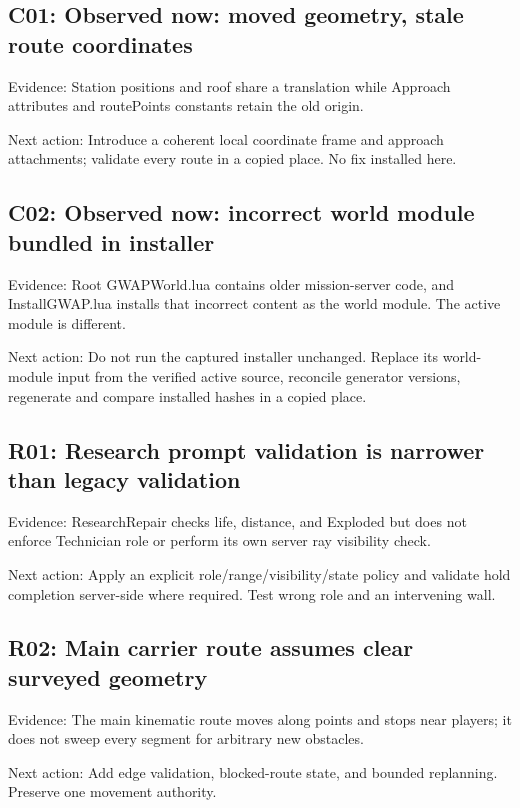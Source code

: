 \subsection{C01: Observed now: moved geometry, stale route coordinates}
Evidence: Station positions and roof share a translation while Approach attributes and routePoints constants retain the old origin.\allowbreak{}

Next action: Introduce a coherent local coordinate frame and approach attachments; validate every route in a copied place.\allowbreak{} No fix installed here.\allowbreak{}

\subsection{C02: Observed now: incorrect world module bundled in installer}
Evidence: Root GWAPWorld.\allowbreak{}lua contains older mission-server code, and InstallGWAP.\allowbreak{}lua installs that incorrect content as the world module.\allowbreak{} The active module is different.\allowbreak{}

Next action: Do not run the captured installer unchanged.\allowbreak{} Replace its world-module input from the verified active source, reconcile generator versions, regenerate and compare installed hashes in a copied place.\allowbreak{}

\subsection{R01: Research prompt validation is narrower than legacy validation}
Evidence: ResearchRepair checks life, distance, and Exploded but does not enforce Technician role or perform its own server ray visibility check.\allowbreak{}

Next action: Apply an explicit role/\allowbreak{}range/\allowbreak{}visibility/\allowbreak{}state policy and validate hold completion server-side where required.\allowbreak{} Test wrong role and an intervening wall.\allowbreak{}

\subsection{R02: Main carrier route assumes clear surveyed geometry}
Evidence: The main kinematic route moves along points and stops near players; it does not sweep every segment for arbitrary new obstacles.\allowbreak{}

Next action: Add edge validation, blocked-route state, and bounded replanning.\allowbreak{} Preserve one movement authority.\allowbreak{}

